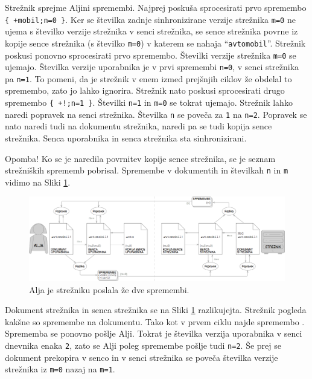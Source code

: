 \documentclass[a4paper, 12pt, twoside]{book}
\begin{document}
Strežnik sprejme Aljini spremembi. Najprej poskuša sprocesirati prvo spremembo {\tt \{ +mobil;n=0 \}}. Ker se številka zadnje sinhronizirane verzije strežnika {\tt m=0} ne ujema s številko verzije strežnika v senci strežnika, se sence strežnika povrne iz kopije sence strežnika (s številko {\tt m=0}) v katerem se nahaja “{\tt avtomobil}”. Strežnik poskusi ponovno sprocesirati prvo spremembo. Številki verzije strežnika {\tt m=0} se ujemajo. Številka verzije uporabnika je v prvi spremembi {\tt n=0}, v senci strežnika pa {\tt n=1}. To pomeni, da je strežnik v enem izmed prejšnjih ciklov že obdelal to spremembo, zato jo lahko ignorira. Strežnik nato poskusi sprocesirati drugo spremembo {\tt \{ +!;n=1 \}}. Številki {\tt n=1} in {\tt m=0} se tokrat ujemajo. Strežnik lahko naredi popravek na senci strežnika. Številka {\tt n} se poveča za {\tt 1} na {\tt n=2}. Popravek se nato naredi tudi na dokumentu strežnika, naredi pa se tudi kopija sence strežnika. Senca uporabnika in senca strežnika sta sinhronizirani.

\pagebreak

Opomba! Ko se je naredila povrnitev kopije sence strežnika, se je seznam strežniških sprememb pobrisal. Spremembe v dokumentih in številkah {\tt n} in {\tt m} vidimo na Sliki \ref{ds8}.

\begin{figure}[placement h]
\begin{center}
\includegraphics[width=16cm]{ds8.png}
\end{center}
\caption{Alja je strežniku poslala že dve spremembi.}
\label{ds8}
\end{figure}

Dokument strežnika in senca strežnika se na Sliki \ref{ds8} razlikujejta. Strežnik pogleda kakšne so spremembe na dokumentu. Tako kot v prvem ciklu najde spremembo . Sprememba se ponovno pošlje Alji. Tokrat je številka verzija uporabnika v senci dnevnika enaka {\tt 2}, zato se Alji poleg spremembe pošlje tudi {\tt n=2}. Še prej se dokument prekopira v senco in v senci strežnika se poveča številka verzije strežnika iz {\tt m=0} nazaj na {\tt m=1}.
\end{document}
